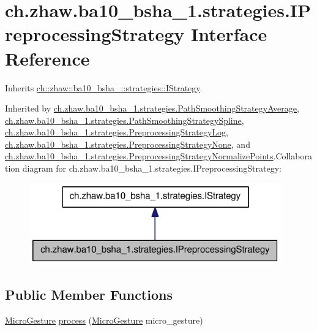 \hypertarget{interfacech_1_1zhaw_1_1ba10__bsha__1_1_1strategies_1_1IPreprocessingStrategy}{
\section{ch.zhaw.ba10\_\-bsha\_\-1.strategies.IPreprocessingStrategy Interface Reference}
\label{interfacech_1_1zhaw_1_1ba10__bsha__1_1_1strategies_1_1IPreprocessingStrategy}
}


Inherits \hyperlink{interfacech_1_1zhaw_1_1ba10__bsha__1_1_1strategies_1_1IStrategy}{ch::zhaw::ba10\_\-bsha\_::strategies::IStrategy}.

Inherited by \hyperlink{classch_1_1zhaw_1_1ba10__bsha__1_1_1strategies_1_1PathSmoothingStrategyAverage}{ch.zhaw.ba10\_\-bsha\_\-1.strategies.PathSmoothingStrategyAverage}, \hyperlink{classch_1_1zhaw_1_1ba10__bsha__1_1_1strategies_1_1PathSmoothingStrategySpline}{ch.zhaw.ba10\_\-bsha\_\-1.strategies.PathSmoothingStrategySpline}, \hyperlink{classch_1_1zhaw_1_1ba10__bsha__1_1_1strategies_1_1PreprocessingStrategyLog}{ch.zhaw.ba10\_\-bsha\_\-1.strategies.PreprocessingStrategyLog}, \hyperlink{classch_1_1zhaw_1_1ba10__bsha__1_1_1strategies_1_1PreprocessingStrategyNone}{ch.zhaw.ba10\_\-bsha\_\-1.strategies.PreprocessingStrategyNone}, and \hyperlink{classch_1_1zhaw_1_1ba10__bsha__1_1_1strategies_1_1PreprocessingStrategyNormalizePoints}{ch.zhaw.ba10\_\-bsha\_\-1.strategies.PreprocessingStrategyNormalizePoints}.Collaboration diagram for ch.zhaw.ba10\_\-bsha\_\-1.strategies.IPreprocessingStrategy:\nopagebreak
\begin{figure}[H]
\begin{center}
\leavevmode
\includegraphics[width=308pt]{interfacech_1_1zhaw_1_1ba10__bsha__1_1_1strategies_1_1IPreprocessingStrategy__coll__graph}
\end{center}
\end{figure}
\subsection*{Public Member Functions}
\begin{DoxyCompactItemize}
\item 
\hyperlink{classch_1_1zhaw_1_1ba10__bsha__1_1_1service_1_1MicroGesture}{MicroGesture} \hyperlink{interfacech_1_1zhaw_1_1ba10__bsha__1_1_1strategies_1_1IPreprocessingStrategy_a3e3885dce8fda7b79dc514078f11ad62}{process} (\hyperlink{classch_1_1zhaw_1_1ba10__bsha__1_1_1service_1_1MicroGesture}{MicroGesture} micro\_\-gesture)
\end{DoxyCompactItemize}


